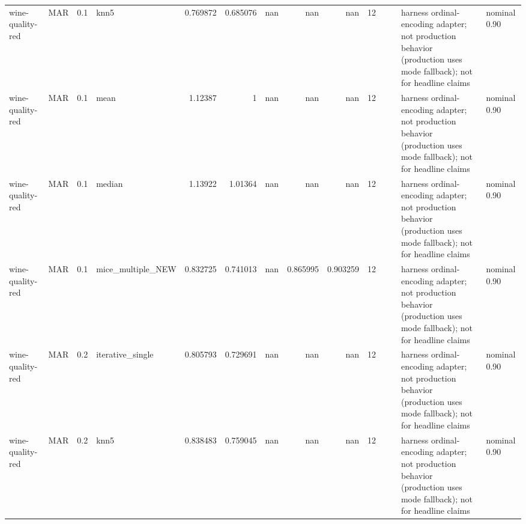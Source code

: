 \begin{table}[ht]
\begin{tabular}{llrlrrrrrrllll}
 wine-quality-red     & MAR         &         0.1 & knn5              &       0.769872 &             0.685076 &               nan        &                     nan        &                       nan        &        12 &                    &                                         & harness ordinal-encoding adapter; not production behavior (production uses mode fallback); not for headline claims & nominal 0.90              \\
 wine-quality-red     & MAR         &         0.1 & mean              &       1.12387  &             1        &               nan        &                     nan        &                       nan        &        12 &                    &                                         & harness ordinal-encoding adapter; not production behavior (production uses mode fallback); not for headline claims & nominal 0.90              \\
 wine-quality-red     & MAR         &         0.1 & median            &       1.13922  &             1.01364  &               nan        &                     nan        &                       nan        &        12 &                    &                                         & harness ordinal-encoding adapter; not production behavior (production uses mode fallback); not for headline claims & nominal 0.90              \\
 wine-quality-red     & MAR         &         0.1 & mice\_multiple\_NEW &       0.832725 &             0.741013 &               nan        &                       0.865995 &                         0.903259 &        12 &                    &                                         & harness ordinal-encoding adapter; not production behavior (production uses mode fallback); not for headline claims & nominal 0.90              \\
 wine-quality-red     & MAR         &         0.2 & iterative\_single  &       0.805793 &             0.729691 &               nan        &                     nan        &                       nan        &        12 &                    &                                         & harness ordinal-encoding adapter; not production behavior (production uses mode fallback); not for headline claims & nominal 0.90              \\
 wine-quality-red     & MAR         &         0.2 & knn5              &       0.838483 &             0.759045 &               nan        &                     nan        &                       nan        &        12 &                    &                                         & harness ordinal-encoding adapter; not production behavior (production uses mode fallback); not for headline claims & nominal 0.90              \\

\end{tabular}
\end{table}

